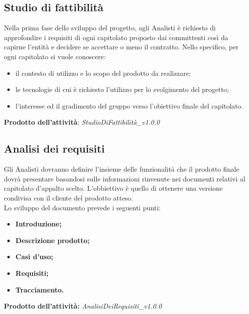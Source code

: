 \documentclass[11pt,a4paper]{article}
\begin{document}
	\subsection{Studio di fattibilità}
	Nella prima fase dello sviluppo del progetto, agli Analisti è richiesto di approfondire i requisiti di ogni capitolato proposto dai committenti così da capirne l'entità e decidere se accettare o meno il contratto. Nello specifico, per ogni capitolato si vuole conoscere:
	\begin{itemize}
		\item il contesto di utilizzo e lo scopo del prodotto da realizzare;
		\item le tecnologie di cui è richiesto l'utilizzo per lo svolgimento del progetto;
		\item l'interesse ed il gradimento del gruppo verso l'obiettivo finale del capitolato.
	\end{itemize}
	\textbf{Prodotto dell'attività}: \textit{StudioDiFattibilità\_v1.0.0}
	
	\subsection{Analisi dei requisiti}
	Gli Analisti dovranno definire l'insieme delle funzionalità che il prodotto finale dovrà presentare basandosi sulle informazioni rinvenute nei documenti relativi al capitolato d'appalto scelto. L'obbiettivo è quello di ottenere una versione condivisa con il cliente del prodotto atteso.\\
	
	Lo sviluppo del documento prevede i seguenti punti:	
	\begin{itemize}
		\item \textbf{Introduzione;}
		\item \textbf{Descrizione prodotto;}
		\item \textbf{Casi d'uso;}
		\item \textbf{Requisiti;}
		\item \textbf{Tracciamento.}
	\end{itemize}

	\textbf{Prodotto dell'attività:} \textit{AnalisiDeiRequisiti\_v1.0.0}
	
\end{document}
